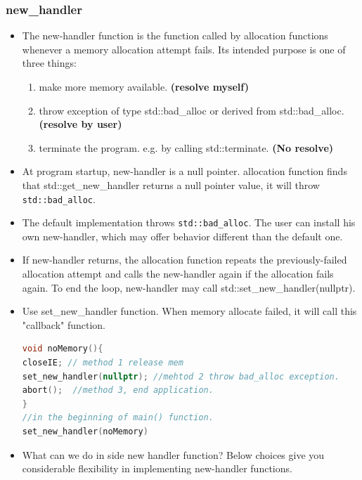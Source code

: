 \documentclass[a4paper,12pt,twoside]{book}
\begin{document}
\subsubsection{new\_handler}
\begin{itemize}
\item  The new-handler function is the function called by allocation functions whenever a memory allocation attempt fails. Its intended purpose is one of three things:

\begin{enumerate}
\item make more memory available. \textbf{(resolve myself)}

\item throw exception of type std::bad\_alloc or derived from std::bad\_alloc. \textbf{(resolve by user)}

\item terminate the program. e.g. by calling std::terminate. \textbf{(No resolve)}
\end{enumerate}

\item At program startup, new-handler is a null pointer. allocation function finds that std::get\_new\_handler returns a null pointer value, it will throw \texttt{std::bad\_alloc}.

\item The default implementation throws \texttt{std::bad\_alloc}. The user can install his own new-handler, which may offer behavior different than the default one.


\item If new-handler returns, the allocation function repeats the previously-failed allocation attempt and calls the new-handler again if the allocation fails again. To end the loop, new-handler may call std::set\_new\_handler(nullptr).


\item Use set\_new\_handler function. When memory allocate failed, it will call this "callback" function.
\begin{lstlisting}[frame=single, language=c++]
void noMemory(){
closeIE; // method 1 release mem
set_new_handler(nullptr); //mehtod 2 throw bad_alloc exception.
abort();  //method 3, end application.
}
//in the beginning of main() function.
set_new_handler(noMemory)
\end{lstlisting}
\item What can we do in side new handler function? Below choices give you considerable flexibility in implementing new-handler functions.
\begin{enumerate}


\end{enumerate}
\end{itemize}
\end{document}
